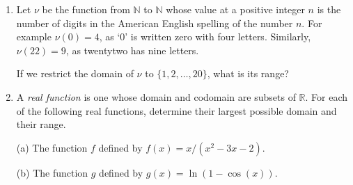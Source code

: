 \documentclass[12pt]{article}
\newcommand{\RR}{{\mathbb R}}  %
\newcommand{\NN}{{\mathbb N}}  %
\newcommand{\demph}[1]{{\color{blue}\sl{#1}}}
\begin{document}
\begin{enumerate}
\item   Let $\nu$ be the function from $\NN$ to $\NN$ whose value at a positive integer $n$ is the number of digits in the American
  English spelling of the number $n$.
  For example $\nu(0)=4$, as `0' is written {\sf zero} with four letters.
  Similarly, $\nu(22)=9$, as {\sf twentytwo} has nine letters.

  If we restrict the domain of $\nu$ to $\{1,2,\dotsc,20\}$, what is its range?

\item A \demph{real function} is one whose domain and codomain are subsets of $\RR$.
  For each of the following real functions, determine their largest possible domain and their range.

  (a) The function $f$ defined by $f(x)=x/(x^2-3x-2)$.

  (b) The function $g$ defined by $g(x)=\ln(1-\cos(x))$.


  
\end{enumerate}
\end{document}
